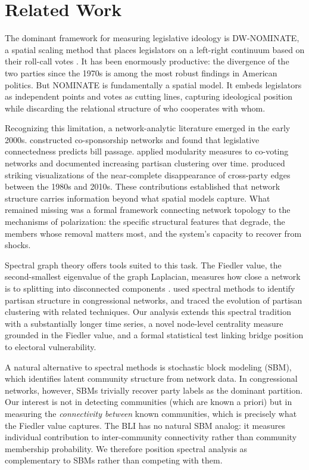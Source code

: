 \documentclass[12pt, a4paper]{article}
\begin{document}
\section{Related Work}

The dominant framework for measuring legislative ideology is DW-NOMINATE, a spatial scaling method that places legislators on a left-right continuum based on their roll-call votes \citep{poole1985, poole2017}. It has been enormously productive: the divergence of the two parties since the 1970s is among the most robust findings in American politics. But NOMINATE is fundamentally a spatial model. It embeds legislators as independent points and votes as cutting lines, capturing ideological position while discarding the relational structure of who cooperates with whom.

Recognizing this limitation, a network-analytic literature emerged in the early 2000s. \citet{fowler2006a} constructed co-sponsorship networks and found that legislative connectedness predicts bill passage. \citet{waugh2009} applied modularity measures to co-voting networks and documented increasing partisan clustering over time. \citet{andris2015} produced striking visualizations of the near-complete disappearance of cross-party edges between the 1980s and 2010s. These contributions established that network structure carries information beyond what spatial models capture. What remained missing was a formal framework connecting network topology to the mechanisms of polarization: the specific structural features that degrade, the members whose removal matters most, and the system's capacity to recover from shocks.

Spectral graph theory offers tools suited to this task. The Fiedler value, the second-smallest eigenvalue of the graph Laplacian, measures how close a network is to splitting into disconnected components \citep{fiedler1973}. \citet{newman2006} used spectral methods to identify partisan structure in congressional networks, and \citet{moody2013} traced the evolution of partisan clustering with related techniques. Our analysis extends this spectral tradition with a substantially longer time series, a novel node-level centrality measure grounded in the Fiedler value, and a formal statistical test linking bridge position to electoral vulnerability.

A natural alternative to spectral methods is stochastic block modeling (SBM), which identifies latent community structure from network data. In congressional networks, however, SBMs trivially recover party labels as the dominant partition. Our interest is not in detecting communities (which are known a priori) but in measuring the \textit{connectivity between} known communities, which is precisely what the Fiedler value captures. The BLI has no natural SBM analog: it measures individual contribution to inter-community connectivity rather than community membership probability. We therefore position spectral analysis as complementary to SBMs rather than competing with them.
\end{document}
